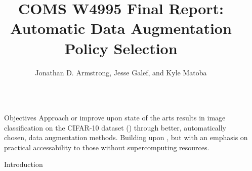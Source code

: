 \documentclass[final]{beamer}
\title{COMS W4995 Final Report: Automatic Data Augmentation Policy Selection} %
\author{Jonathan D. Armstrong, Jesse Galef, and Kyle Matoba} %
\institute{Computer Science Department, Columbia University} %
\newlength{\sepwid}
\newlength{\onecolwid}
\begin{document}
\setlength{\belowcaptionskip}{2ex} %
\setlength\belowdisplayshortskip{2ex} %

\begin{frame}[t] %
\begin{columns}[t] %

\begin{column}{\sepwid} \end{column} %
\begin{column}{\onecolwid} %

\begin{alertblock}{Objectives}
Approach or improve upon state of the arts results in image classification on the CIFAR-10 dataset (\cite{Krizhevsky2009}) through better, automatically chosen, data augmentation methods. Building upon \cite{Cubuk2018}, but with an emphasis on practical accessability to those without supercomputing resources.
\end{alertblock}


\begin{block}{Introduction}

% 


\end{block}
\end{column}
\end{columns}
\end{frame}
\end{document}
